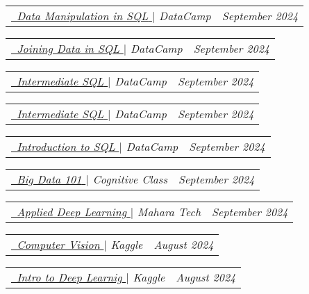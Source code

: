 \documentclass[letterpaper,11pt]{article}
\makeatletter
\newcommand{\resumeSubSubheading}[2]{
    \item
    \begin{tabular*}{0.97\textwidth}{l@{\extracolsep{\fill}}r}
      \textit{\small#1} & \textit{\small #2} \\
    \end{tabular*}\vspace{-7pt}
}
\makeatother
\begin{document}
      \resumeSubSubheading
      {\href{https://www.datacamp.com/completed/statement-of-accomplishment/course/98d733b3f3463dc76b5ef7724849a18d85390986}  
      {\raisebox{-0.2\height}
      \
      \underline{Data Manipulation in SQL} } $|$ \emph{DataCamp}
      }{September 2024}

      \resumeSubSubheading
      {\href{https://www.datacamp.com/completed/statement-of-accomplishment/course/f787e655cf32b960411de668221f0a877053feca}  
      {\raisebox{-0.2\height}
      \
      \underline{Joining Data in SQL} } $|$ \emph{DataCamp}
      }{September 2024}

      \resumeSubSubheading
      {\href{https://www.datacamp.com/completed/statement-of-accomplishment/course/0a4a55e38a3be74de41a3d40263bd0e4196bd78a}  
      {\raisebox{-0.2\height}
      \
      \underline{Intermediate SQL} } $|$ \emph{DataCamp}
      }{September 2024}


      \resumeSubSubheading
      {\href{https://www.datacamp.com/completed/statement-of-accomplishment/course/0a4a55e38a3be74de41a3d40263bd0e4196bd78a}  
      {\raisebox{-0.2\height}
      \
      \underline{Intermediate SQL} } $|$ \emph{DataCamp}
      }{September 2024}


      \resumeSubSubheading
      {\href{https://www.datacamp.com/completed/statement-of-accomplishment/course/e595f217f0d4699d75bb0bd72516e626d626171c}  
      {\raisebox{-0.2\height}
      \
      \underline{Introduction to SQL} } $|$ \emph{DataCamp}
      }{September 2024}


      \resumeSubSubheading
      {\href{https://courses.cognitiveclass.ai/certificates/06fd6d81006a4b87ac9d3ab6aaaf44e2}  
      {\raisebox{-0.2\height}
      \
      \underline{Big Data 101} } $|$ \emph{Cognitive Class}
      }{September 2024}


      \resumeSubSubheading
      {\href{}  
      {\raisebox{-0.2\height}
      \
      \underline{Applied Deep Learning} } $|$ \emph{Mahara Tech}
      }{September 2024}
      
      

      \resumeSubSubheading
      {\href{https://www.kaggle.com/learn/certification/ibrahimhendawi/computer-vision}  
      {\raisebox{-0.2\height}
      \ 
      \underline{Computer Vision} } $|$ \emph{Kaggle}
      }{August 2024}

      \resumeSubSubheading
      {\href{https://www.kaggle.com/learn/certification/ibrahimhendawi/intro-to-deep-learning}  
      {\raisebox{-0.2\height}
      \ 
      \underline{Intro to Deep Learnig} } $|$ \emph{Kaggle}
      }{August 2024}
\end{document}
